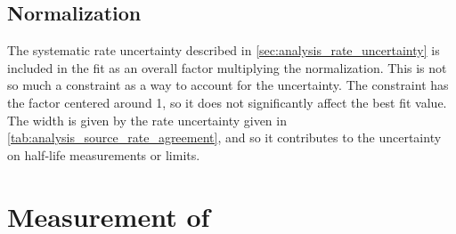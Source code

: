 \documentclass[herrin-thesis.tex]{subfiles}
\begin{document}
\subsection{Normalization}
The systematic rate uncertainty described in \cref{sec:analysis_rate_uncertainty} is included in the fit as an overall factor multiplying the normalization. This is not so much a constraint as a way to account for the uncertainty. The constraint has the factor centered around 1, so it does not significantly affect the best fit value. The width is given by the rate uncertainty given in \cref{tab:analysis_source_rate_agreement}, and so it contributes to the uncertainty on half-life measurements or limits.

\section{Measurement of \twonu}
\label{sec:analysis_twonu_measurement}
\end{document}
